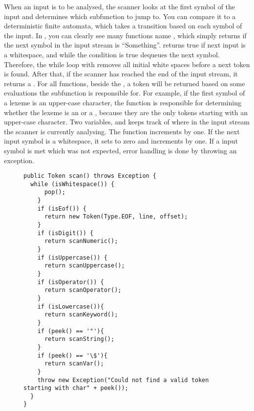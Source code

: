 When an input is to be analysed, the scanner looks at the first symbol of the input and determines which subfunction to jump to. You can compare it to a deterministic finite automata, which takes a transition based on each symbol of the input. In , you can clearly see many functions name , which simply returns if the next symbol in the input stream is ``Something''.  returns true if next input is a whitespace, and while the condition is true  dequeues the next symbol. Therefore, the while loop with  removes all initial white spaces before a next token is found. After that, if the scanner has reached the end of the input stream, it returns a . For all  functions, beside the , a token will be returned based on some evaluations the subfunction is responsible for. For example, if the first symbol of a lexeme is an upper-case character, the function  is responsible for determining whether the lexeme is an  or a , because they are the only tokens starting with an upper-case character. Two variables,   and   keeps track of where in the input stream the scanner is currently analysing. The function  increments  by one. If the next input symbol is a whitespace, it sets  to zero and increments  by one. If a input symbol is met which was not expected, error handling is done by throwing an exception. 

\begin{figure}
\begin{lstlisting}
public Token scan() throws Exception {
  while (isWhitespace()) {
      pop();
    }
    if (isEof()) {
      return new Token(Type.EOF, line, offset);
    }
    if (isDigit()) {
      return scanNumeric();
    }
    if (isUppercase()) {
      return scanUppercase();
    }
    if (isOperator()) {
      return scanOperator();
    }
    if (isLowercase()){
      return scanKeyword();
    }
    if (peek() == '"'){
      return scanString();
    }
    if (peek() == '\$'){
      return scanVar();
    }
    throw new Exception("Could not find a valid token starting with char" + peek());
  }
}
\end{lstlisting}
\label{lst:scan}
\end{figure}